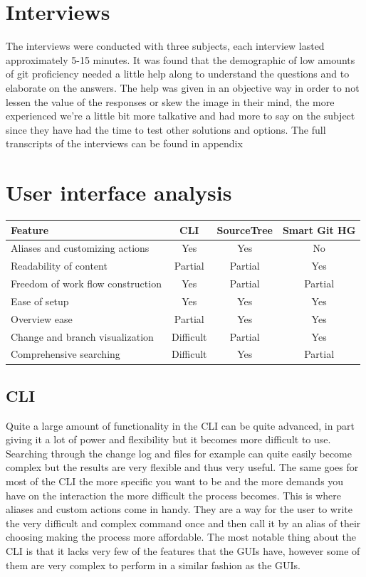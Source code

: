 \documentclass[a4paper,oneside]{bth} %
\begin{document}
			\section{Interviews}
			The interviews were conducted with three subjects, each interview lasted approximately 5-15 minutes. It was found that the demographic of low amounts of git proficiency needed a little help along to understand the questions and to elaborate on the answers. The help was given in an objective way in order to not lessen the value of the responses or skew the image in their mind, the more experienced we're a little bit more talkative and had more to say on the subject since they have had the time to test other solutions and options. 
			The full transcripts of the interviews can be found in appendix %
			\section{User interface analysis}
				\begin{center}
					\begin{tabular}{ | p{5cm} | c | c | c | }
					\hline
					Feature & CLI & SourceTree & Smart Git HG \\ 
					\hline
					Aliases and customizing actions & Yes & Yes & No \\
					\hline
					Readability of content & Partial & Partial & Yes \\
					\hline
					Freedom of work flow construction & Yes & Partial & Partial \\
					\hline
					Ease of setup & Yes & Yes & Yes \\
					\hline
					Overview ease & Partial & Yes & Yes \\
					\hline
					Change and branch visualization & Difficult & Partial & Yes \\
					\hline
					Comprehensive searching & Difficult & Yes & Partial \\
					\hline
					\end{tabular}
					 \label{tab:UI-Analysis}
				\end{center}
				\subsection{CLI}
				Quite a large amount of functionality in the CLI can be quite advanced, in part giving it a lot of power and flexibility but it becomes more difficult to use. Searching through the change log and files for example can quite easily become complex but the results are very flexible and thus very useful. The same goes for most of the CLI the more specific you want to be and the more demands you have on the interaction the more difficult the process becomes. This is where aliases and custom actions come in handy. They are a way for the user to write the very difficult and complex command once and then call it by an alias of their choosing making the process more affordable.
				The most notable thing about the CLI is that it lacks very few of the features that the GUIs have, however some of them are very complex to perform in a similar fashion as the GUIs.
\end{document}
